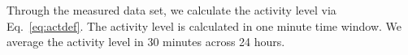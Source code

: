 Through the measured data set, we calculate the activity level via Eq.~\ref{eq:actdef}.
The activity level is calculated in one minute time window.
We average the activity level in 30 minutes across 24 hours.



\begin{table}
\centering %
\begin{tabular}{|l|c|c|c|c|c|c|c|c|c|c|c|c|c|} %
\hline %

\end{tabular}
\end{table}
